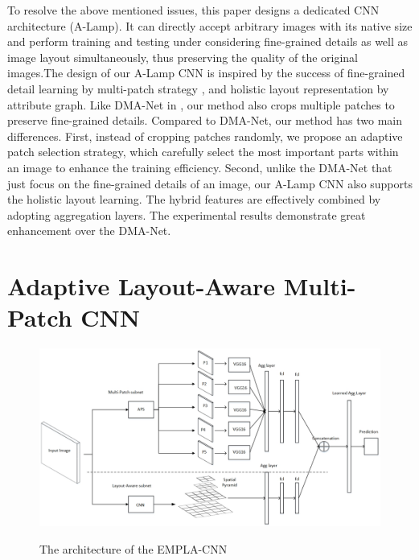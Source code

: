 \documentclass[10pt,twocolumn,letterpaper]{article}
\begin{document}
To resolve the above mentioned issues, this paper designs a dedicated CNN architecture (A-Lamp). It can directly accept arbitrary images with its native size and perform training and testing under considering fine-grained details as well as image layout simultaneously, thus preserving the quality of the original images.The design of our A-Lamp CNN is inspired by the success of fine-grained detail learning by multi-patch strategy \cite{Lu:2015:ICCV} \cite{Liu:2016:CVPR:multi_patch}, and holistic layout representation by attribute graph. Like DMA-Net in \cite{Lu:2015:ICCV}, our method also crops 
multiple patches to preserve fine-grained details. Compared to DMA-Net, 
our method has two main differences. First, instead of cropping patches
randomly, we propose an adaptive patch selection strategy, which carefully
select the most important parts within an image to enhance the training 
efficiency. Second, unlike the DMA-Net that just focus on the fine-grained 
details of an image, our A-Lamp CNN also supports the holistic layout learning.
The hybrid features are effectively combined by adopting aggregation layers. The experimental results demonstrate great enhancement over the DMA-Net.


\section{Adaptive Layout-Aware Multi-Patch CNN}
\begin{figure}
	\centering
	\includegraphics[scale=0.26]{figures/whole_net.jpg}
	\label{whole_net}
	\caption{The architecture of the EMPLA-CNN}
\end{figure}
\end{document}
